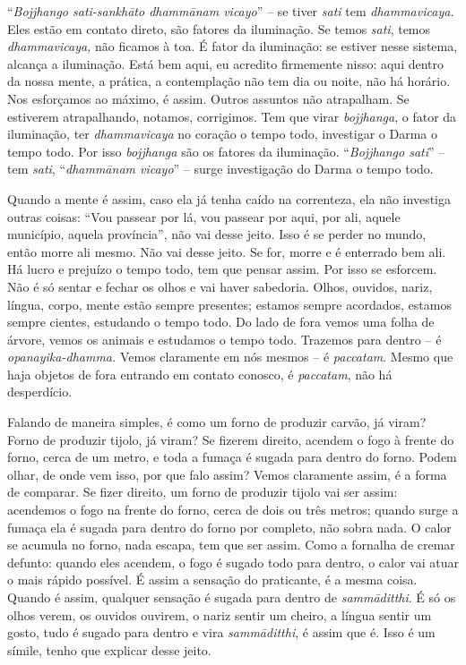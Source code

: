 “\textit{Bojjhango sati-sankh\=ato dhamm\=anam vicayo}” – se tiver
\textit{sati} tem \textit{dhammavicaya.} Eles estão em contato direto,
são fatores da iluminação. Se temos \textit{sati}, temos
\textit{dhammavicaya,} não ficamos à toa. É fator da iluminação: se
estiver nesse sistema, alcança a iluminação. Está bem aqui, eu acredito
firmemente nisso: aqui dentro da nossa mente, a prática, a contemplação
não tem dia ou noite, não há horário. Nos esforçamos ao máximo, é
assim. Outros assuntos não atrapalham. Se estiverem atrapalhando,
notamos, corrigimos. Tem que virar \textit{bojjhanga}, o fator da
iluminação, ter \textit{dhammavicaya} no coração o tempo todo,
investigar o Darma o tempo todo. Por isso \textit{bojjhanga} são os
fatores da iluminação. “\textit{Bojjhango sati}” – tem \textit{sati},
“\textit{dhamm\=anam vicayo}” – surge investigação do Darma o tempo
todo. 

Quando a mente é assim, caso ela já tenha caído na correnteza, ela
não investiga outras coisas: “Vou passear por lá, vou passear por aqui,
por ali, aquele município, aquela província”, não vai desse jeito. Isso
é se perder no mundo, então morre ali mesmo. Não vai desse jeito. Se
for, morre e é enterrado bem ali. Há lucro e prejuízo o tempo todo, tem
que pensar assim. Por isso se esforcem. Não é só sentar e fechar os
olhos e vai haver sabedoria. Olhos, ouvidos, nariz, língua, corpo,
mente estão sempre presentes; estamos sempre acordados, estamos sempre
cientes, estudando o tempo todo. Do lado de fora vemos uma folha de
árvore, vemos os animais e estudamos o tempo todo. Trazemos para dentro
– é \textit{opanayika-dhamma. }Vemos claramente em nós mesmos – é
\textit{paccatam}. Mesmo que haja objetos de fora entrando em contato
conosco, é \textit{paccatam}, não há desperdício. 

Falando de maneira simples, é como um forno de produzir carvão, já
viram? Forno de produzir tijolo, já viram? Se fizerem direito, acendem
o fogo à frente do forno, cerca de um metro, e toda a fumaça é sugada
para dentro do forno. Podem olhar, de onde vem isso, por que falo
assim? Vemos claramente assim, é a forma de comparar. Se fizer direito,
um forno de produzir tijolo vai ser assim: acendemos o fogo na frente
do forno, cerca de dois ou três metros; quando surge a fumaça ela é
sugada para dentro do forno por completo, não sobra nada. O calor se
acumula no forno, nada escapa, tem que ser assim. Como a fornalha de
cremar defunto: quando eles acendem, o fogo é sugado todo para dentro,
o calor vai atuar o mais rápido possível. É assim a sensação do
praticante, é a mesma coisa. Quando é assim, qualquer sensação é sugada
para dentro de \textit{samm\=aditthi}. É só os olhos verem, os ouvidos
ouvirem, o nariz sentir um cheiro, a língua sentir um gosto, tudo é
sugado para dentro e vira \textit{samm\=aditthi}, é assim que é. Isso é
um símile, tenho que explicar desse jeito.

